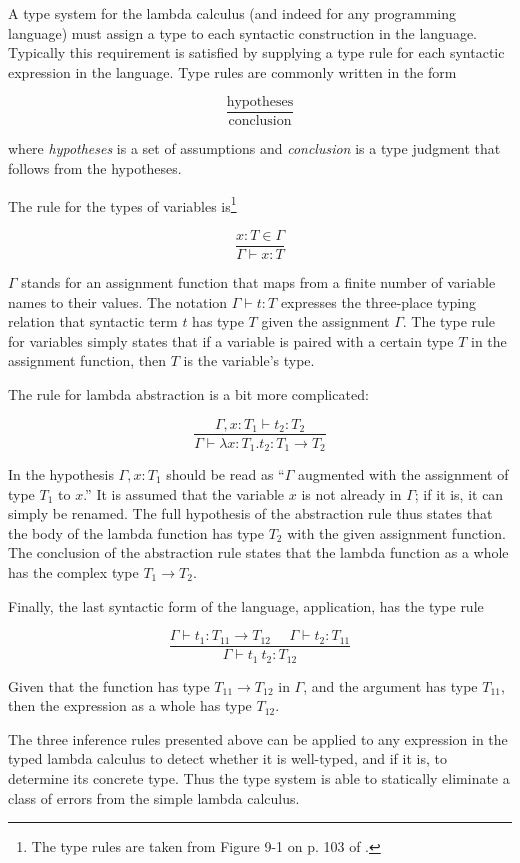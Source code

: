 \documentclass{article}
\begin{document}
A type system for the lambda calculus (and indeed for any programming language) must assign a type to each syntactic construction in the language. Typically this requirement is satisfied by supplying a type rule for each syntactic expression in the language. Type rules are commonly written in the form

\[
\frac{\text{hypotheses}}
{\text{conclusion}}
\]

where \textit{hypotheses} is a set of assumptions and \textit{conclusion} is a type judgment that follows from the hypotheses.

The rule for the types of variables is\footnote{The type rules are taken from Figure 9-1 on p. 103 of \cite{types}.}

\[
\frac{x : T \in \Gamma}
{\Gamma \vdash x : T}
\]

$\Gamma$ stands for an assignment function that maps from a finite number of variable names to their values. The notation $\Gamma \vdash t : T$ expresses the three-place typing relation that syntactic term $t$ has type $T$ given the assignment $\Gamma$. The type rule for variables simply states that if a variable is paired with a certain type $T$ in the assignment function, then $T$ is the variable's type.

The rule for lambda abstraction is a bit more complicated:

\[
\frac{\Gamma, x : T_1 \vdash t_2 : T_2}
{\Gamma \vdash \lambda x : T_1 . t_2 : T_1 \to T_2}
\]

In the hypothesis $\Gamma, x : T_1$ should be read as ``$\Gamma$ augmented with the assignment of type $T_1$ to $x$.'' It is assumed that the variable $x$ is not already in $\Gamma$; if it is, it can simply be renamed. The full hypothesis of the abstraction rule thus states that the body of the lambda function has type $T_2$ with the given assignment function. The conclusion of the abstraction rule states that the lambda function as a whole has the complex type $T_1 \to T_2$.

Finally, the last syntactic form of the language, application, has the type rule

\[
\frac{\Gamma \vdash t_1 : T_{11} \to T_{12}\ \ \ \ \ \ \Gamma \vdash t_2 : T_{11}}
{\Gamma \vdash t_1\ t_2 : T_{12}}
\]

Given that the function has type $T_{11} \to T_{12}$ in $\Gamma$, and the argument has type $T_{11}$, then the expression as a whole has type $T_{12}$.

The three inference rules presented above can be applied to any expression in the typed lambda calculus to detect whether it is well-typed, and if it is, to determine its concrete type. Thus the type system is able to statically eliminate a class of errors from the simple lambda calculus.
\end{document}
